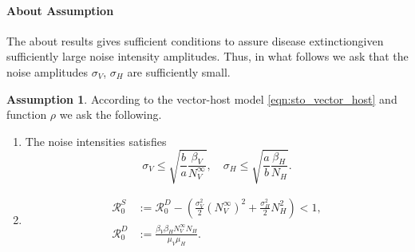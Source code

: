 \documentclass{amsart}
\theoremstyle{plain}
\theoremstyle{definition}
\newtheorem{assumption}{Assumption}
\begin{document}
    \paragraph{About Assumption}
    The about results gives sufficient conditions to assure 
    disease extinction\textemdash given sufficiently large noise intensity 
    amplitudes. Thus, in what follows we ask that the noise amplitudes 
    $\sigma_V$, $\sigma_H$ are sufficiently small.
    \begin{assumption}\label{ass:extintion}
        According to the vector-host model \eqref{eqn:sto_vector_host} and 
        function
        $\rho$
        we ask the following.
        \begin{enumerate}[(E\textendash1)]
            \item \label{ass:noise_condition}
                The noise intensities satisfies
                $$
                    \sigma_V \leq 
                        \sqrt{
                            \frac{b}{a}
                            \frac{\beta_V}{N_V^{\infty}}
                            },
                     \quad
                    \sigma_H \leq
                        \sqrt{
                            \frac{a}{b}
                            \frac{\beta_H }{N_H
                        }}.
                $$
            \item
                \begin{equation*}
                    \begin{aligned}
                        \mathcal{R}_0 ^ S &:=
                            \mathcal{R}_0^D - 
                            \left( 
                                \frac{\sigma_V ^ 2}{2} (N_V ^ {\infty}) ^ 2
                                +
                                \frac{\sigma_H ^ 2}{2} N_H ^ 2
                            \right)
                            <1,
                            \\
                        \mathcal{R}_0 ^ D &:=
                                \frac{\beta_V \beta_H N_V ^ \infty 
                                N_H}{\mu_V \mu_H} .
                    \end{aligned}
                \end{equation*}
        \end{enumerate}
    \end{assumption}        
%
%
%
%
\end{document}

